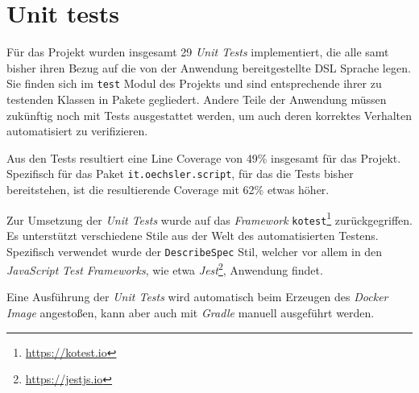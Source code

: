 \section{Unit tests}
\label{sec:unit_tests}

Für das Projekt wurden insgesamt 29 \emph{Unit Tests} implementiert, die alle samt bisher ihren Bezug auf die von der Anwendung bereitgestellte DSL Sprache legen.
Sie finden sich im \texttt{test} Modul des Projekts und sind entsprechende ihrer zu testenden Klassen in Pakete gegliedert.
Andere Teile der Anwendung müssen zukünftig noch mit Tests ausgestattet werden, um auch deren korrektes Verhalten automatisiert zu verifizieren.

Aus den Tests resultiert eine Line Coverage von 49\% insgesamt für das Projekt.
Spezifisch für das Paket \texttt{it.oechsler.script}, für das die Tests bisher bereitstehen, ist die resultierende Coverage mit 62\% etwas höher.

Zur Umsetzung der \emph{Unit Tests} wurde auf das \emph{Framework} \texttt{kotest}\footnote{\url{https://kotest.io}} zurückgegriffen.
Es unterstützt verschiedene Stile aus der Welt des automatisierten Testens.
Spezifisch verwendet wurde der \texttt{DescribeSpec} Stil, welcher vor allem in den \emph{JavaScript} \emph{Test Frameworks}, wie etwa \emph{Jest}\footnote{\url{https://jestjs.io}}, Anwendung findet.

Eine Ausführung der \emph{Unit Tests} wird automatisch beim Erzeugen des \emph{Docker} \emph{Image} angestoßen, kann aber auch mit \emph{Gradle} manuell ausgeführt werden.